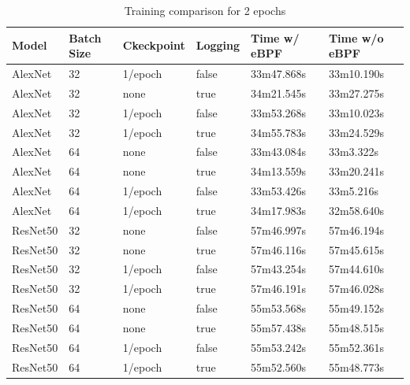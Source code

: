 \documentclass[conference]{IEEEtran}
\begin{document}
\begin{table}
    \begin{center}
        \begin{tabular}[c]{|l|l|l|l|l|l|}
            \hline
            \rowcolor{gray}
            Model & Batch Size & Ckeckpoint & Logging & Time w/ eBPF & Time w/o eBPF \\
            \hline
            AlexNet & 32 & 1/epoch & false &    33m47.868s & 33m10.190s \\
            \hline
            AlexNet & 32 & none & true &    34m21.545s & 33m27.275s \\
            \hline
            AlexNet & 32 & 1/epoch & false &    33m53.268s & 33m10.023s \\
            \hline
            AlexNet & 32 & 1/epoch & true &    34m55.783s & 33m24.529s \\
            \hline
            AlexNet & 64 & none & false &    33m43.084s & 33m3.322s \\
            \hline
            AlexNet & 64 & none & true &    34m13.559s & 33m20.241s \\
            \hline
            AlexNet & 64 & 1/epoch & false &    33m53.426s & 33m5.216s \\
            \hline
            AlexNet & 64 & 1/epoch & true &    34m17.983s & 32m58.640s \\
            \hline
            ResNet50 & 32 & none & false &    57m46.997s & 57m46.194s \\
            \hline
            ResNet50 & 32 & none & true &     57m46.116s & 57m45.615s \\
            \hline
            ResNet50 & 32 & 1/epoch & false &    57m43.254s & 57m44.610s \\
            \hline
            ResNet50 & 32 & 1/epoch & true &     57m46.191s & 57m46.028s \\
            \hline
            ResNet50 & 64 & none & false &    55m53.568s & 55m49.152s \\
            \hline
            ResNet50 & 64 & none & true &     55m57.438s & 55m48.515s \\
            \hline
            ResNet50 & 64 & 1/epoch & false &    55m53.242s & 55m52.361s \\
            \hline
            ResNet50 & 64 & 1/epoch & true &     55m52.560s & 55m48.773s \\
            \hline
        \end{tabular}
    \end{center}
    \caption{Training comparison for 2 epochs}\label{tab:perf}
\end{table}
\end{document}
